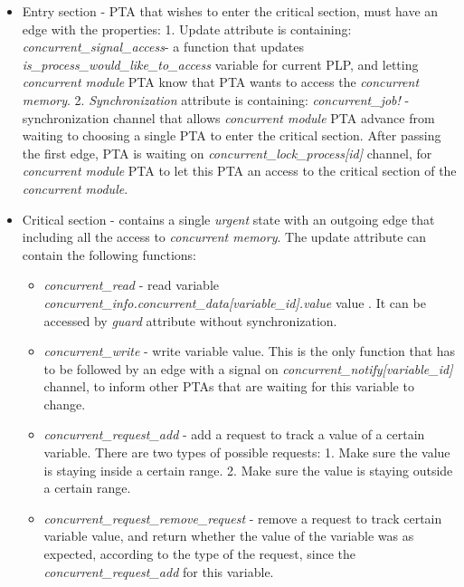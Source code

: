 \begin{itemize}
\item Entry section - PTA that wishes to enter the critical section, must have an edge with the properties: 1. Update attribute is containing: \textcolor{ColorUppaalFunction}{\textit{concurrent_signal_access}}​ - a function that updates \textcolor{ColorEdgeGuard}{\textit{is_process_would_like_to_access}} variable for current PLP, and letting \textit{concurrent module} PTA know that PTA wants to access the \textit{concurrent memory}. 2. \textit{Synchronization} attribute is containing: \textcolor{ColorUppaalChannel}{\textit{concurrent_job!}} - synchronization channel that allows \textit{concurrent module} PTA advance from waiting to choosing a single PTA to enter the critical section. After passing the first edge, PTA is waiting on \textcolor{ColorUppaalChannel}{\textit{concurrent_lock_process[id]}} channel, for \textit{concurrent module} PTA to let this PTA an access to the critical section of the \textit{concurrent module}. 
\item Critical section - contains a single \textit{urgent} state with an outgoing edge that including all the access to \textit{concurrent memory}. The update attribute can contain the following functions:\begin{itemize}
\item \textcolor{ColorUppaalFunction}{\textit{concurrent_read}} - read variable \textcolor{ColorEdgeGuard}{\textit{concurrent_info.concurrent_data[\textcolor{ColorEdgeGuard}{\textit{variable_id}}].value}} value . It can be accessed by \textit{guard} attribute without synchronization.
\item \textcolor{ColorUppaalFunction}{\textit{concurrent_write}} - write variable value. This is the only function that has to be followed by an edge with a signal on \textcolor{ColorUppaalChannel}{\textit{concurrent_notify[\textcolor{ColorEdgeGuard}{\textit{variable_id}}]}} channel, to inform other PTAs that are waiting for this variable to change. 
\item \textcolor{ColorUppaalFunction}{\textit{concurrent_request_add}} - add a request to track a value of a certain variable. There are two types of possible requests: 1. Make sure the value is staying inside a certain range. 2. Make sure the value is staying outside a certain range.
\item \textcolor{ColorUppaalFunction}{\textit{concurrent_request_remove_request}} - remove a request to track certain variable value, and return whether the value of the variable was as expected, according to the type of the request, since the \textcolor{ColorUppaalFunction}{\textit{concurrent_request_add}} for this variable. \end{itemize}

\end{itemize}
